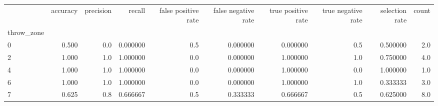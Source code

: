 \begin{tabular}{lrrrrrrrrr}
\toprule
{} &  accuracy &  precision &    recall &  false positive rate &  false negative rate &  true positive rate &  true negative rate &  selection rate &  count \\
throw\_zone &           &            &           &                      &                      &                     &                     &                 &        \\
\midrule
0          &     0.500 &        0.0 &  0.000000 &                  0.5 &             0.000000 &            0.000000 &                 0.5 &        0.500000 &    2.0 \\
2          &     1.000 &        1.0 &  1.000000 &                  0.0 &             0.000000 &            1.000000 &                 1.0 &        0.750000 &    4.0 \\
4          &     1.000 &        1.0 &  1.000000 &                  0.0 &             0.000000 &            1.000000 &                 0.0 &        1.000000 &    1.0 \\
6          &     1.000 &        1.0 &  1.000000 &                  0.0 &             0.000000 &            1.000000 &                 1.0 &        0.333333 &    3.0 \\
7          &     0.625 &        0.8 &  0.666667 &                  0.5 &             0.333333 &            0.666667 &                 0.5 &        0.625000 &    8.0 \\
\bottomrule
\end{tabular}
